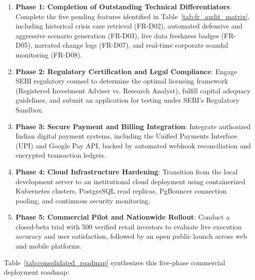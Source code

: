 \begin{enumerate}
    \item \textbf{Phase 1: Completion of Outstanding Technical Differentiators}: Complete the five pending features identified in Table~\ref{tab:fr_audit_matrix}, including historical crisis case retrieval (FR-D02), automated defensive and aggressive scenario generation (FR-D03), live data freshness badges (FR-D05), narrated change logs (FR-D07), and real-time corporate scandal monitoring (FR-D08).
    \item \textbf{Phase 2: Regulatory Certification and Legal Compliance}: Engage SEBI regulatory counsel to determine the optimal licensing framework (Registered Investment Adviser vs. Research Analyst), fulfill capital adequacy guidelines, and submit an application for testing under SEBI's Regulatory Sandbox.
    \item \textbf{Phase 3: Secure Payment and Billing Integration}: Integrate authorized Indian digital payment systems, including the Unified Payments Interface (UPI) and Google Pay API, backed by automated webhook reconciliation and encrypted transaction ledgers.
    \item \textbf{Phase 4: Cloud Infrastructure Hardening}: Transition from the local development server to an institutional cloud deployment using containerized Kubernetes clusters, PostgreSQL read replicas, PgBouncer connection pooling, and continuous security monitoring.
    \item \textbf{Phase 5: Commercial Pilot and Nationwide Rollout}: Conduct a closed-beta trial with 500 verified retail investors to evaluate live execution accuracy and user satisfaction, followed by an open public launch across web and mobile platforms.
\end{enumerate}

Table~\ref{tab:consolidated_roadmap} synthesizes this five-phase commercial deployment roadmap:

